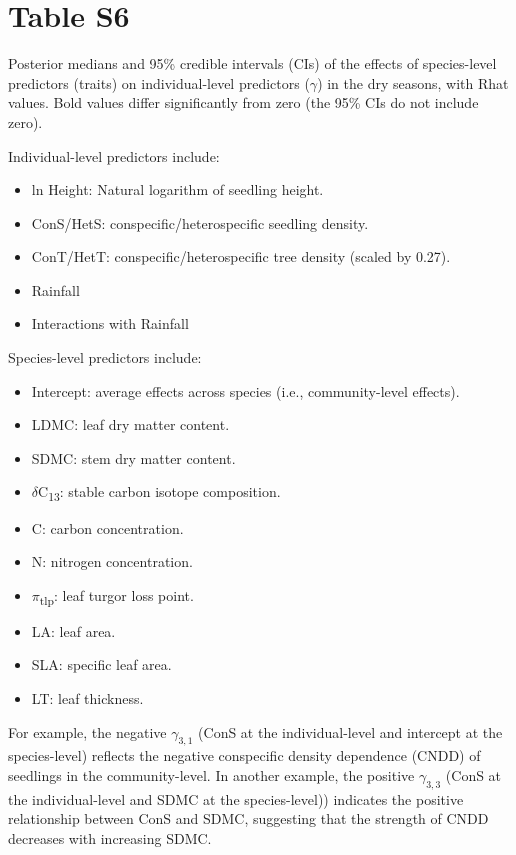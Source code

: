 \documentclass[
  12pt,
  letterpaper,
  DIV=11,
  numbers=noendperiod]{scrartcl}
\providecommand{\tightlist}{%
  \setlength{\itemsep}{0pt}\setlength{\parskip}{0pt}}\usepackage{longtable,booktabs,array}
\begin{document}
\newpage

\hypertarget{table-s6}{%
\section{Table S6}\label{table-s6}}

Posterior medians and 95\% credible intervals (CIs) of the effects of
species-level predictors (traits) on individual-level predictors
(\(\gamma\)) in the dry seasons, with Rhat values. Bold values differ
significantly from zero (the 95\% CIs do not include zero).

Individual-level predictors include:

\begin{itemize}
\tightlist
\item
  ln Height: Natural logarithm of seedling height.
\item
  ConS/HetS: conspecific/heterospecific seedling density.
\item
  ConT/HetT: conspecific/heterospecific tree density (scaled by 0.27).
\item
  Rainfall
\item
  Interactions with Rainfall
\end{itemize}

Species-level predictors include:

\begin{itemize}
\tightlist
\item
  Intercept: average effects across species (i.e., community-level
  effects).
\item
  LDMC: leaf dry matter content.
\item
  SDMC: stem dry matter content.
\item
  \(\delta\)C\textsubscript{13}: stable carbon isotope composition.
\item
  C: carbon concentration.
\item
  N: nitrogen concentration.
\item
  \(\pi\)\textsubscript{tlp}: leaf turgor loss point.
\item
  LA: leaf area.
\item
  SLA: specific leaf area.
\item
  LT: leaf thickness.
\end{itemize}

For example, the negative \(\gamma_{3,1}\) (ConS at the individual-level
and intercept at the species-level) reflects the negative conspecific
density dependence (CNDD) of seedlings in the community-level. In
another example, the positive \(\gamma_{3,3}\) (ConS at the
individual-level and SDMC at the species-level)) indicates the positive
relationship between ConS and SDMC, suggesting that the strength of CNDD
decreases with increasing SDMC.
\end{document}
